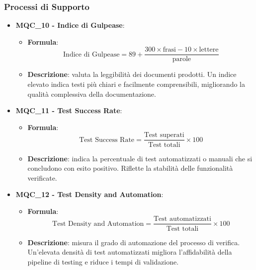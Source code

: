 \subsubsection{Processi di Supporto}
\begin{itemize}
\item \textbf{MQC\_10 - Indice di Gulpease}:
    \begin{itemize}
        \item \textbf{Formula}:
        \[
            \text{Indice di Gulpease} =
            89 + \frac{300 \times \text{frasi} - 10 \times \text{lettere}}{\text{parole}}
        \]
        \item \textbf{Descrizione}: valuta la leggibilità dei documenti prodotti. Un indice elevato indica testi più chiari e facilmente comprensibili, migliorando la qualità complessiva della documentazione.
    \end{itemize}

\item \textbf{MQC\_11 - Test Success Rate}:
    \begin{itemize}
        \item \textbf{Formula}:
        \[
            \text{Test Success Rate} =
            \frac{\text{Test superati}}{\text{Test totali}} \times 100
        \]
        \item \textbf{Descrizione}: indica la percentuale di test automatizzati o manuali che si concludono con esito positivo. Riflette la stabilità delle funzionalità verificate.
    \end{itemize}

\item \textbf{MQC\_12 - Test Density and Automation}:
    \begin{itemize}
        \item \textbf{Formula}:
        \[
            \text{Test Density and Automation} =
            \frac{\text{Test automatizzati}}{\text{Test totali}} \times 100
        \]
        \item \textbf{Descrizione}: misura il grado di automazione del processo di verifica. Un’elevata densità di test automatizzati migliora l’affidabilità della pipeline di testing e riduce i tempi di validazione.
    \end{itemize}
\end{itemize}

